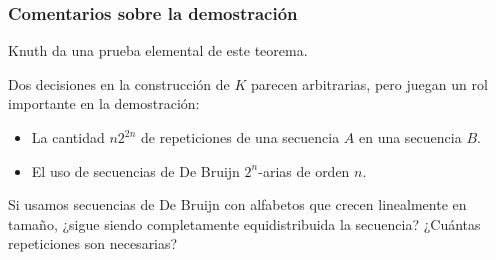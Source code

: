 \documentclass[t, 10pt, mathserif]{beamer}
\begin{document}

\begin{frame}
  \frametitle{Comentarios sobre la demostración}

  Knuth da una prueba elemental de este teorema.
  \pause
  
  Dos decisiones en la construcción de $K$ parecen arbitrarias, pero juegan un rol importante en la demostración:
  \pause

  \begin{itemize}
    \item La cantidad $n 2^{2n}$ de repeticiones de una secuencia $A$ en una secuencia $B$. \pause
  
    \item El uso de secuencias de De Bruijn $2^n$-arias de orden $n$.

  \end{itemize}
  \pause

  Si usamos secuencias de De Bruijn con alfabetos que crecen linealmente en tamaño, {\color{cyan}¿sigue siendo completamente equidistribuida la secuencia? ¿Cuántas repeticiones son necesarias?}
\end{frame}

\end{document}
